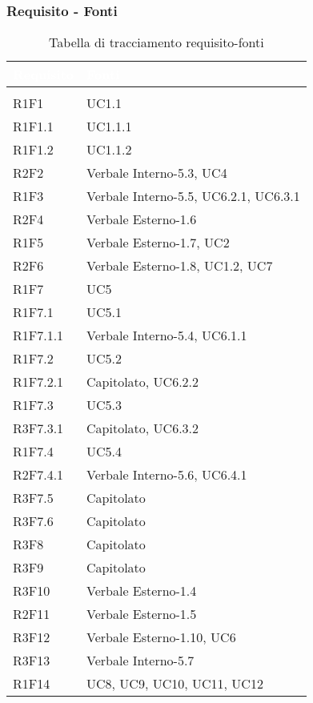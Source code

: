 \subsubsection{Requisito - Fonti}
\renewcommand{\arraystretch}{1.5}
\begin{center}
\begin{longtable}{C{6cm} C{6cm}}
		\textcolor{white}{\textbf{Requisito}} & 
		\textcolor{white}{\textbf{Fonti}}\\
		\endfirsthead
	    \\
	    \endfoot
	    \caption{Tabella di tracciamento requisito-fonti}
	    \endlastfoot


R1F1 & UC1.1 \\
R1F1.1 & UC1.1.1 \\
R1F1.2 & UC1.1.2 \\
R2F2 & Verbale Interno-5.3, UC4 \\
R1F3 & Verbale Interno-5.5, UC6.2.1, UC6.3.1 \\
R2F4 & Verbale Esterno-1.6 \\
R1F5 & Verbale Esterno-1.7, UC2 \\
R2F6 & Verbale Esterno-1.8, UC1.2, UC7 \\
R1F7 & UC5 \\
R1F7.1 & UC5.1 \\
R1F7.1.1 & Verbale Interno-5.4, UC6.1.1 \\
R1F7.2 & UC5.2 \\
R1F7.2.1 & Capitolato, UC6.2.2 \\
R1F7.3 & UC5.3 \\
R3F7.3.1 & Capitolato, UC6.3.2 \\
R1F7.4 & UC5.4 \\
R2F7.4.1 & Verbale Interno-5.6, UC6.4.1 \\
R3F7.5 & Capitolato \\
R3F7.6 & Capitolato \\
R3F8 & Capitolato \\
R3F9 & Capitolato \\
R3F10 & Verbale Esterno-1.4 \\
R2F11 & Verbale Esterno-1.5 \\
R3F12 & Verbale Esterno-1.10, UC6 \\
R3F13 & Verbale Interno-5.7 \\
R1F14 & UC8, UC9, UC10, UC11, UC12 \\



\end{longtable}
\end{center}
